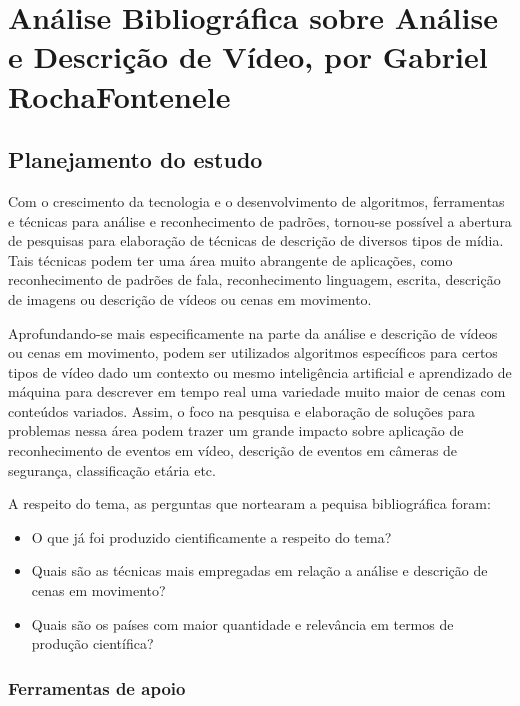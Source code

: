 \chapter{Análise Bibliográfica sobre Análise e Descrição de Vídeo, por Gabriel RochaFontenele\label{chap:bibliometria:ngsylar}}

\section{Planejamento do estudo}

Com o crescimento da tecnologia e o desenvolvimento de algoritmos, ferramentas e técnicas para análise e reconhecimento de padrões, tornou-se possível a abertura de pesquisas para elaboração de técnicas de descrição de diversos tipos de mídia. Tais técnicas podem ter uma área muito abrangente de aplicações, como reconhecimento de padrões de fala, reconhecimento linguagem, escrita, descrição de imagens ou descrição de vídeos ou cenas em movimento.

Aprofundando-se mais especificamente na parte da análise e descrição de vídeos ou cenas em movimento, podem ser utilizados algoritmos específicos para certos tipos de vídeo dado um contexto ou mesmo inteligência artificial e aprendizado de máquina para descrever em tempo real uma variedade muito maior de cenas com conteúdos variados. Assim, o foco na pesquisa e elaboração de soluções para problemas nessa área podem trazer um grande impacto sobre aplicação de reconhecimento de eventos em vídeo, descrição de eventos em câmeras de segurança, classificação etária etc.

A respeito do tema, as perguntas que nortearam a pequisa bibliográfica foram:

\begin{itemize}

\item O que já foi produzido cientificamente a respeito do tema?
\item Quais são as técnicas mais empregadas em relação a análise e descrição de cenas em movimento?
\item Quais são os países com maior quantidade e relevância em termos de produção científica?

\end{itemize}


\subsection{Ferramentas de apoio}

